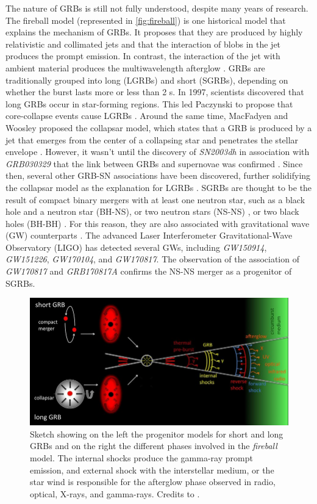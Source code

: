 The nature of GRBs is still not fully understood, despite many years of research. The fireball model (represented in \autoref{fig:fireball}) is one historical model that explains the mechanism of GRBs. It proposes that they are produced by highly relativistic and collimated jets and that the interaction of blobs in the jet produces the prompt emission. In contrast, the interaction of the jet with ambient material produces the multiwavelength afterglow \cite{Bhat_2011}. GRBs are traditionally grouped into long (LGRBs) and short (SGRBs), depending on whether the burst lasts more or less than 2 s. In 1997, scientists discovered that long GRBs occur in star-forming regions. This led Paczynski to propose that core-collapse events cause LGRBs \cite{paczynski_1998}. Around the same time, MacFadyen and Woosley proposed the collapsar model, which states that a GRB is produced by a jet that emerges from the center of a collapsing star and penetrates the stellar envelope \cite{macfadyen_woosley_1999}. However, it wasn't until the discovery of \textit{SN2003dh} in association with \textit{GRB030329} that the link between GRBs and supernovae was confirmed \cite{hjorth_et_al_2003}. Since then, several other GRB-SN associations have been discovered, further solidifying the collapsar model as the explanation for LGRBs \cite{bromberg2012observational}. SGRBs are thought to be the result of compact binary mergers with at least one neutron star, such as a black hole and a neutron star (BH-NS), or two neutron stars (NS-NS) \cite{cohen1995distribution}, or two black holes (BH-BH) \cite{Perna_2016}. For this reason, they are also associated with 
gravitational wave (GW) counterparts \cite{abbott_et_al_2017}. The advanced Laser Interferometer Gravitational-Wave Observatory (LIGO) has detected several GWs, including \textit{GW150914}, \textit{GW151226}, \textit{GW170104}, and \textit{GW170817}. The observation of the association of \textit{GW170817} and \textit{GRB170817A} \cite{abbott_et_al_2017} confirms the NS-NS merger as a progenitor of SGRBs.
 \begin{figure}[t]
\centering
\includegraphics[width=1\linewidth]{figures/introduction/grb-fireball.png}
\caption{Sketch showing on the left the progenitor models for short and long GRBs and on the right the different phases involved in the \textit{fireball} model. The internal shocks produce the gamma-ray prompt emission, and external shock with the interstellar medium, or the star wind is responsible
for the afterglow phase observed in radio, optical, X-rays, and gamma-rays. Credits to \cite{Gomboc_2012}.}
\label{fig:fireball}
\end{figure}


